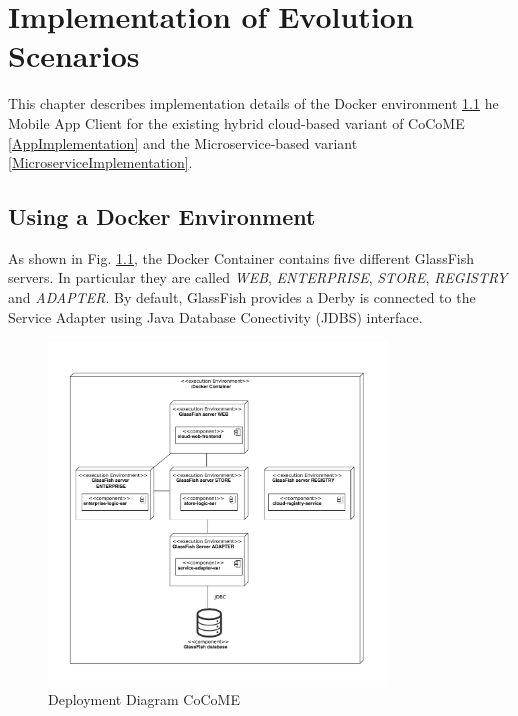 \chapter{Implementation of Evolution Scenarios}
\label{c:implementation}
This chapter describes implementation details of the Docker environment \ref{DockerImplementation}\deleted{,} 
he Mobile App Client for the existing hybrid cloud-based variant of CoCoME \deleted{(}\ref{AppImplementation}\deleted{)} and the Microservice-based variant \deleted{(}\ref{MicroserviceImplementation}\deleted{)}.


\section{Using a Docker Environment}\label{DockerImplementation}
 	As shown in Fig. \ref*{Deploym_CoCoME}, the Docker Container contains five different GlassFish servers. In particular they are called \textit{WEB}, \textit{ENTERPRISE}, \textit{STORE}, \textit{REGISTRY} and \textit{ADAPTER}. 
 	By default, GlassFish provides a Derby 
 	 is connected to the Service Adapter using  Java Database Conectivity (JDBS) interface.
 	\begin{figure}[h]
 		\centering
 		\includegraphics[width = 0.8\textwidth]{img/docker_Container_Deployment.pdf}
 		\caption{Deployment Diagram CoCoME}
 		\label{Deploym_CoCoME}
 	\end{figure}
